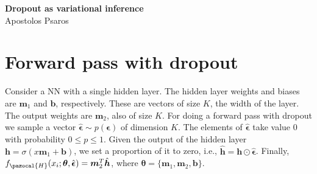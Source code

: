 

\newcommand{\bw}{\boldsymbol{w}}
\newcommand{\bp}{\boldsymbol{p}}
\newcommand{\bth}{\boldsymbol{\theta}}
\newcommand{\bA}{\boldsymbol{A}}
\newcommand{\cH}{\pazocal{H}}
\newcommand{\cN}{\pazocal{N}}
\newcommand{\cP}{\pazocal{P}}
\newcommand{\cD}{\pazocal{D}}
\newcommand{\cO}{\pazocal{O}}
\newcommand{\cL}{\pazocal{L}}


\setcounter{tocdepth}{3}

	
	\sloppy
	
	\begin{center}	
		\Large
		\textbf{Dropout as variational inference}\\
		\large
		Apostolos Psaros\\	
	\end{center}
	\vskip 0.25in
	


\section{Forward pass with dropout}
Consider a NN with a single hidden layer. 
The hidden layer weights and biases are $\boldsymbol{m}_1$ and $\boldsymbol{b}$, respectively.
These are vectors of size $K$, the width of the layer.
The output weights are $\boldsymbol{m}_2$, also of size $K$. 
For doing a forward pass with dropout we sample a vector $\hat{\boldsymbol{\epsilon}} \sim p(\boldsymbol{\epsilon})$ of dimension $K$. 
The elements of $\hat{\boldsymbol{\epsilon}}$ take value $0$ with probability $0 \leq p \leq 1$. 
Given the output of the hidden layer $\boldsymbol{h} = \sigma(x\boldsymbol{m}_1+\boldsymbol{b})$, we set a proportion of it to zero, i.e., $\hat{\boldsymbol{h}} = \boldsymbol{h}\odot \hat{\boldsymbol{\epsilon}}$. 
Finally, $f_{\cH}(x_i;\bth, \hat{\boldsymbol{\epsilon}})= \boldsymbol{m}_2^T\hat{\boldsymbol{h}}$, where $\bth = \{\boldsymbol{m}_1, \boldsymbol{m}_2, \boldsymbol{b}\}$.


